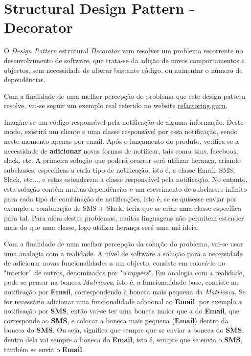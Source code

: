 \section{Structural Design Pattern - Decorator}
\label{sec:decorator}

\hspace{3mm} O \textit{Design Pattern} estrutural \textit{Decorator} vem resolver um problema recorrente no desenvolvimento de software, que trata-se da adição de novos comportamentos a objectos, sem necessidade de alterar bastante código, ou aumentar o número de dependências.

Com a finalidade de uma melhor percepção do problema que este design pattern resolve, vai-se seguir um exemplo real referido no website \href{https://refactoring.guru/design-patterns/decorator}{refactoring.guru}. 

Imagine-se um código responsável pela notificação de alguma informação. Deste modo, existirá um cliente e uma classe responsável por essa notificação, sendo neste momento apenas por email. Após o lançamento do produto, verifica-se a necessidade de \textbf{adicionar} novas formas de notificar, tais como: sms, facebook, slack, etc. A primeira solução que poderá ocorrer será utilizar herança, criando subclasses, específicas a cada tipo de notificação, isto é, a classe Email, SMS, Slack, etc..., e estas estenderem a classe responsável pela notificação. No entanto, esta solução contém muitas dependências e um crescimento de subclasses infinito para cada tipo de combinação de notificações, isto é, se se quisesse enviar por exemplo a combinação de SMS + Slack, teria que se criar uma classe específica para tal. Para além destes problemas, muitas linguagens não permitem estender mais do que uma classe, logo utilizar herança será uma má ideia.

Com a finalidade de uma melhor percepção da solução do problema, vai-se usar uma analogia com a realidade. A nível de software a solução para a necessidade de adicionar novas funcionalidades a um objecto, consiste em colocá-lo no "interior"\ de outros, denominados por "\textit{wrappers}".
Em analogia com a realidade, pode-se pensar na boneca \textit{Matriosca}, isto é, a funcionalidade base, consiste na notificação por \textbf{Email}, correspondendo à boneca mais pequena da \textit{Matriosca}. Se for necessário adicionar uma funcionalidade adicional ao \textbf{Email}, por exemplo a notificação por \textbf{SMS}, então vai-se ter uma boneca maior que a do \textbf{Email}, que corresponde ao \textbf{SMS}, e colocar a boneca mais pequena (\textbf{Email}) dentro da boneca do \textbf{SMS}. Ou seja, significa que sempre que se enviar a boneca do \textbf{SMS}, dentro dela vai sempre a boneca do \textbf{Email}, isto é, sempre que se envia o \textbf{SMS}, também se envia o \textbf{Email}.

